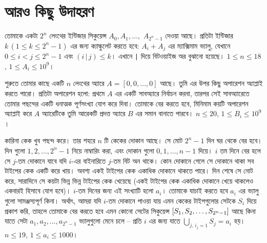 \section{আরও কিছু উদাহরণ}

\begin{example}
  তোমাকে একটা $2^n$ লেংথের ইন্টিজার সিকুয়েন্স $A_0, A_1, \ldots,$ $A_{2^n-1}$
  দেওয়া আছে। প্রতিটা ইন্টিজার $k \, (1 \le k \le 2^n-1)$ এর জন্য ক্যাল্কুলেট
  করতে হবে: $A_i + A_j$ এর ম্যাক্সিমাম ভ্যালু, যেখানে $0 \le i < j \le 2^n-1$
  এবং $(i \, \texttt{|} \, j) \le k$। এখানে \texttt{|} দিয়ে বিটওয়াইজ অর
  বুঝানো হয়েছে। $1 \le n \le 18$, $1 \le A_i \le 10^9$।
\end{example}
\begin{example}
  শুরুতে তোমার কাছে একটি $n$ লেংথের অ্যারে $A = [0, 0, \ldots, 0]$ আছে। তুমি
  এর উপর কিছু অপারেশন অ্যাপ্লাই করতে পারো। প্রতিটা অপারেশন হলো: প্রথমে $A$ এর
  একটি সাবঅ্যারে নির্বাচন করবা, তারপর সেই সাবঅ্যারেতে তোমার পছন্দের একটি
  ধনাত্মক পূর্ণসংখ্যা যোগ করে দিবা। তোমাকে বের করতে হবে, মিনিমাম কয়টি অপারেশন
  অ্যাপ্লাই করে $A$ অ্যারেটিকে তুমি আরেকটি প্রদত্ত অ্যারে $B$ এর সমান বানাতে
  পারবে। $n \le 20$, $1 \le B_i \le 10^9$।
\end{example}
\begin{example}
  কারিনা কেক খুব পছন্দ করে। তার শহরে $n$ টি কেকের দোকান আছে। সে মোট $2^n-1$
  দিন ঘর থেকে বের হবে। দিন গুলো $1, 2, \ldots, 2^{n}-1$ নিয়ে নাম্বারিং করা,
  এবং দোকান গুলো $0, 1, \ldots, n-1$ দিয়ে। $i$ তম দিনে বের হলে সে $j$-তম
  দোকানে যাবে যদি $i$-এর বাইনারিতে $j$-তম বিট অন থাকে। কোন দোকানে গেলে সে
  দোকানে থাকা সব টাইপের কেক একটি করে খায়। অবশ্য একই টাইপের কেক একাধিক দোকানে
  থাকতে পারে। দিন শেষে সে নোট করে, সারাদিনে সে কয়টা ভিন্ন ভিন্ন টাইপের কেক
  খেয়েছে (একই টাইপের কেক একাধিক দোকানে খেয়ে থাকলেও একবারই হিসাবে যোগ হবে)।
  $i$-তম দিনের জন্য এই সংখ্যাটি হলো $a_i$। তোমাকে যাচাই করতে হবে $a_i$ এর
  ভ্যালু গুলো সামঞ্জস্যপূর্ণ কিনা। অর্থাৎ, আমরা যদি $i$-তম দোকানে পাওয়া যায়
  এমন কেকের টাইপগুলোর সেটকে $S_i$ দিয়ে প্রকাশ করি, তাহলে তোমাকে বের করতে হবে
  এমন কোনো সেটের সিকুয়েন্স $\left [ S_1, S_2, \ldots, S_{2^n-1} \right ]$ আছে কিনা যাতে
  সেটা $a_1, a_2, \ldots, a_{2^n-1}$ ভ্যালুগুলো মেনে চলে -- প্রতি $i$ এর জন্য
  যাতে $\bigcup_{j,\, i_j = 1} S_j = a_i$ হয়। $n \le 19$, $1 \le a_i \le
  1000$।
\end{example}
\begin{example}
  
\end{example}
